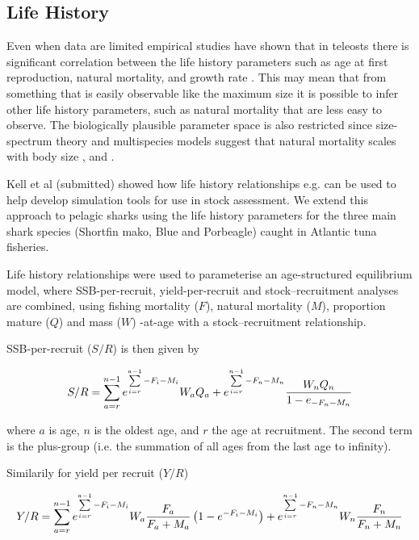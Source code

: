 \documentclass[preprint,authoryear,12pt]{elsarticle}
\begin{document}
\subsection{Life History}
Even when data are limited empirical studies have shown that in teleosts there is significant correlation between the life history parameters  
such as age at first  reproduction, natural mortality, and growth rate \citet{roff1984evolution}. This may mean that from something that  
is easily observable like the maximum size it is possible to infer other life history parameters, such as natural mortality that are less easy to observe.  
The biologically plausible parameter space is also restricted since size-spectrum theory and multispecies models  
suggest that natural mortality scales with body size \citet{andersen2006asymptotic}, \citet{pope2006modelling} and \citet{gislason2008coexistence}.  

Kell et al (submitted) showed how life history relationships e.g. \citet{gislason2010does} can be used to help develop simulation tools for use
in stock assessment. We extend this approach to pelagic sharks using the life history parameters for the three main shark species 
(Shortfin mako, Blue and Porbeagle) caught in Atlantic tuna fisheries.
 
Life history relationships were used to parameterise an age-structured equilibrium model, where SSB-per-recruit, yield-per-recruit  
and stock–recruitment analyses are combined, using fishing mortality ($F$), natural mortality ($M$), proportion  
mature ($Q$) and mass ($W$) -at-age with a stock–recruitment relationship. 
 
SSB-per-recruit ($S/R$) is then given by 
 
\begin{equation} 
S/R=\sum\limits_{a=r}^{n-1} {e^{\sum\limits_{i=r}^{a-1} {-F_i-M_i}}} W_a Q_a + e^{\sum\limits_{i=r}^{n-1} {-F_n-M_n}} \frac{W_n Q_n}{1-e_{-F_n-M_n}}\\ 
\end{equation}  
 
where $a$ is age, $n$ is the oldest age, and $r$ the age at recruitment. The second term is the plus-group (i.e. the summation of all ages from the  
last age to infinity).  
 
Similarily for yield per recruit ($Y/R$) 
 
\begin{equation} 
Y/R=\sum\limits_{a=r}^{n-1} {e^{\sum\limits_{i=r}^{a-1} {-F_i-M_i}}} W_a\frac{F_a}{F_a+M_a}\left(1-e^{-F_i-M_i} \right) + e^{\sum\limits_{i=r}^{n-1} {-F_n-M_n}} W_n\frac{F_n}{F_n+M_n}\\ 
\end{equation}  
 
\end{document}
